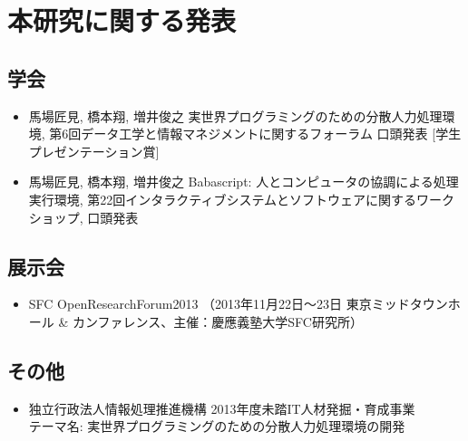 \chapter*{本研究に関する発表}
\label{chap:publications}

\section*{学会}
\begin{itemize}
  \item 馬場匠見, 橋本翔, 増井俊之 実世界プログラミングのための分散人力処理環境,
        第6回データ工学と情報マネジメントに関するフォーラム 口頭発表
        [学生プレゼンテーション賞]
  \item 馬場匠見, 橋本翔, 増井俊之 Babascript: 人とコンピュータの協調による処理実行環境,
        第22回インタラクティブシステムとソフトウェアに関するワークショップ, 口頭発表
\end{itemize}

\section*{展示会}
\begin{itemize}
  \item SFC OpenResearchForum2013 （2013年11月22日〜23日 東京ミッドタウンホール \& カンファレンス、主催：慶應義塾大学SFC研究所）
\end{itemize}

\section*{その他}
\begin{itemize}
  \item 独立行政法人情報処理推進機構 2013年度未踏IT人材発掘・育成事業\\
        テーマ名: 実世界プログラミングのための分散人力処理環境の開発
\end{itemize}

